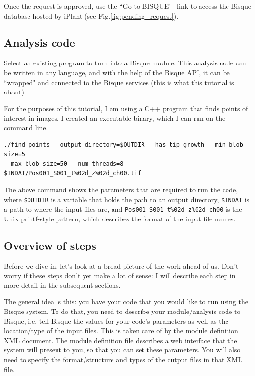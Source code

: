 \documentclass[12pt]{article}
\begin{document}
Once the request is approved, use the 
``Go to BISQUE"~\cite{Bisque-iplant} link to access the 
Bisque database hosted by iPlant (see Fig.\ref{fig:pending_request}).


\subsection{Analysis code}
\label{sec:analysis_code}

Select an existing program to turn into a Bisque module.
This analysis code can be written in any language, and with the help
of the Bisque API, it can be ``wrapped" and connected to the
Bisque services (this is what this tutorial is about).

For the purposes of this tutorial, I am using a C++ program
that finds points of interest in images. 
I created an executable binary, which I can run on the command line.

\begin{verbatim}
./find_points --output-directory=$OUTDIR --has-tip-growth --min-blob-size=5 
--max-blob-size=50 --num-threads=8 $INDAT/Pos001_S001_t%02d_z%02d_ch00.tif
\end{verbatim}

The above command shows the parameters that are required
to run the code, where \texttt{\$OUTDIR} is a variable that holds the path to an output
directory, \texttt{\$INDAT} is a path to where the input files are, 
and \texttt{Pos001\_S001\_t\%02d\_z\%02d\_ch00}
is the Unix printf-style pattern, which describes the format of the 
input file names.

\subsection{Overview of steps}
Before we dive in, let's look at a broad picture of the work ahead of us. Don't worry if these steps don't yet make a lot of sense: I will describe each step in more detail in the subsequent sections.

The general idea is this: you have your code that you would like to run using the Bisque system. To do that, you need to describe your module/analysis code to Bisque, i.e. tell Bisque the values for your code's parameters as well as the location/type of the input files. This is taken care of by the module definition XML document. The module definition file describes a web interface that the system will present to you, so that you can set these parameters. You will also need to specify the format/structure and types of the output files in that XML file. %
\end{document}
